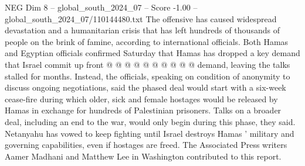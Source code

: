 \begin{textsample}{NEG Dim 8 – global\_south\_2024\_07 – Score -1.00 – global\_south\_2024\_07/110144480.txt}
The offensive has caused widespread devastation and a humanitarian crisis that has left hundreds of thousands of people on the brink of famine, according to international officials.
Both Hamas and Egyptian officials confirmed Saturday that Hamas has dropped a key demand that Israel commit up front @ @ @ @ @ @ @ @ @ @ demand, leaving the talks stalled for months.
Instead, the officials, speaking on condition of anonymity to discuss ongoing negotiations, said the phased deal would start with a six-week cease-fire during which older, sick and female hostages would be released by Hamas in exchange for hundreds of Palestinian prisoners.
Talks on a broader deal, including an end to the war, would only begin during this phase, they said.
Netanyahu has vowed to keep fighting until Israel destroys Hamas ' military and governing capabilities, even if hostages are freed.
The Associated Press writers Aamer Madhani and Matthew Lee in Washington contributed to this report.

\end{textsample}
